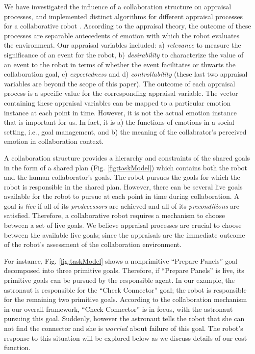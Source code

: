 \documentclass[conference]{IEEEtran}
\begin{document}
We have investigated the influence of a collaboration structure on
appraisal processes, and implemented distinct algorithms for different
appraisal processes for a collaborative robot \cite{shayganfar:appraisal}.
According to the appraisal theory, the outcome of these processes are separable
antecedents of emotion with which the robot evaluates the environment. Our
appraisal variables included: a) \textit{relevance} to measure the significance
of an event for the robot, b) \textit{desirability} to characterize the value of
an event to the robot in terms of whether the event facilitates or thwarts the
collaboration goal, c) \textit{expectedness} and d) \textit{controllability}
(these last two appraisal variables are beyond the scope of this paper). The
outcome of each appraisal process is a specific value for the corresponding
appraisal variable. The vector containing these appraisal variables can be
mapped to a particular emotion instance at each point in time. However, it is
not the actual emotion instance that is important for us. In fact, it is a) the
functions of emotions in a social setting, i.e., goal management, and b) the
meaning of the collabrator's perceived emotion in collaboration context.

A collaboration structure provides a hierarchy and constraints of the shared
goals in the form of a shared plan (Fig. \ref{fig:taskModel}) which contains
both the robot and the human collaborator's goals. The robot pursues the goals
for which the robot is responsible in the shared plan. However, there can be
several live goals available for the robot to pursue at each point in time
during collaboration. A goal is \textit{live} if all of its
\textit{predecessors} are achieved and all of its \textit{preconditions} are
satisfied. Therefore, a collaborative robot requires a mechanism to choose
between a set of live goals. We believe appraisal processes are crucial to
choose between the available live goals; since the appraisals are the immediate
outcome of the robot's assessment of the collaboration environment.

For instance, Fig. \ref{fig:taskModel} shows a nonprimitive ``Prepare Panels''
goal decomposed into three primitive goals. Therefore, if ``Prepare Panels'' is
live, its primitive goals can be pursued by the responsible agent. In our
example, the astronaut is responsible for the ``Check Connector'' goal; the
robot is responsible for the remaining two primitive goals. According to the
collaboration mechanism in our overall framework, ``Check Connector'' is in
focus, with the astronaut pursuing this goal. Suddenly, however the astronaut
tells the robot that she can not find the connector and she is \textit{worried}
about failure of this goal. The robot's response to this situation will be
explored below as we discuss details of our cost function.
\end{document}
